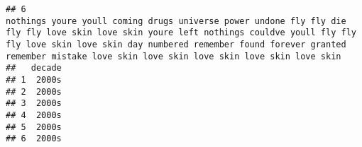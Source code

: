 \documentclass[]{article}
\newenvironment{Shaded}{\begin{snugshade}}{\end{snugshade}}
\newcommand{\FloatTok}[1]{\textcolor[rgb]{0.00,0.00,0.81}{#1}}
\newcommand{\NormalTok}[1]{#1}
\newcommand{\OperatorTok}[1]{\textcolor[rgb]{0.81,0.36,0.00}{\textbf{#1}}}
\newcommand{\StringTok}[1]{\textcolor[rgb]{0.31,0.60,0.02}{#1}}
\begin{document}
\begin{verbatim}
## 6                                                                                                                                                                                                                                                                                                                                                                                                    nothings youre youll coming drugs universe power undone fly fly die fly fly love skin love skin youre left nothings couldve youll fly fly fly love skin love skin day numbered remember found forever granted remember mistake love skin love skin love skin love skin love skin
##   decade
## 1  2000s
## 2  2000s
## 3  2000s
## 4  2000s
## 5  2000s
## 6  2000s
\end{verbatim}

\begin{Shaded}
\end{Shaded}
\end{document}
